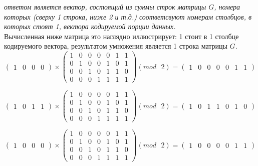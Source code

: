 \documentclass[a5paper, 10pt]{article}
\theoremstyle{definition}
\theoremstyle{plain}
\theoremstyle{remark}
\begin{document}
\textit{ответом является вектор, состоящий из суммы строк матрицы $G$, номера которых (сверху 1 строка, ниже 2 и т.д.) соответсвуют номерам столбцов, в которых стоят 1, вектора кодируемой порции данных.}\\
Вычисленная ниже матрица это наглядно иллюстрирует: 1 стоит в 1 столбце кодируемого вектора, результатом умножения является 1 строка матрицы $G$.
\begin{equation}
\begin{pmatrix}
1 & 0 & 0 & 0
\end{pmatrix}
 \times
\begin{pmatrix}
1 & 0 & 0 & 0 & 0 & 1 & 1\\
0 & 1 & 0 & 0 & 1 & 0 & 1\\
0 & 0 & 1 & 0 & 1 & 1 & 0\\
0 & 0 & 0 & 1 & 1 & 1 & 1
\end{pmatrix}
(mod \text{ }2)
= \begin{pmatrix}
1 & 0 & 0 & 0 & 0 & 1 & 1
\end{pmatrix}
\end{equation}

\begin{equation}
\begin{pmatrix}
1 & 0 & 1 & 1
\end{pmatrix}
 \times
\begin{pmatrix}
1 & 0 & 0 & 0 & 0 & 1 & 1\\
0 & 1 & 0 & 0 & 1 & 0 & 1\\
0 & 0 & 1 & 0 & 1 & 1 & 0\\
0 & 0 & 0 & 1 & 1 & 1 & 1
\end{pmatrix}
(mod \text{ }2)
= \begin{pmatrix}
1 & 0 & 1 & 1 & 0 & 1 & 0
\end{pmatrix}
\end{equation}

\begin{equation}
\begin{pmatrix}
1 & 0 & 0 & 0
\end{pmatrix}
 \times
\begin{pmatrix}
1 & 0 & 0 & 0 & 0 & 1 & 1\\
0 & 1 & 0 & 0 & 1 & 0 & 1\\
0 & 0 & 1 & 0 & 1 & 1 & 0\\
0 & 0 & 0 & 1 & 1 & 1 & 1
\end{pmatrix}
(mod \text{ }2)
= \begin{pmatrix}
1 & 0 & 0 & 0 & 0 & 1 & 1
\end{pmatrix}
\end{equation}
\end{document}
